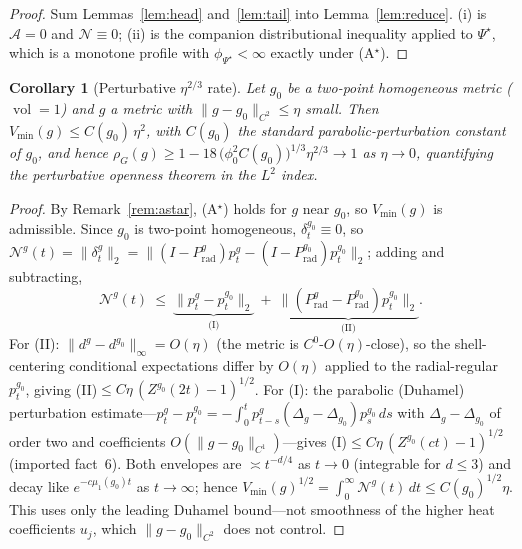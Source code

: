 \documentclass[11pt]{article}
\newtheorem{corollary}[theorem]{Corollary}
\theoremstyle{remark}
\newcommand{\vol}{\operatorname{vol}}
\newcommand{\rhoG}{\rho_G}
\begin{document}
\begin{proof}
Sum Lemmas~\ref{lem:head} and~\ref{lem:tail} into Lemma~\ref{lem:reduce}. (i) is
$\mathcal A=0$ and $\mathcal N\equiv0$; (ii) is the companion distributional inequality
applied to $\Psi^\star$, which is a monotone profile with $\phi_{\Psi^\star}<\infty$ exactly
under \textup{(A$^\star$)}.
\end{proof}

\begin{corollary}[Perturbative $\eta^{2/3}$ rate]\label{cor:pert}
Let $g_0$ be a two-point homogeneous metric ($\vol=1$) and $g$ a metric with
$\lVert g-g_0\rVert_{C^2}\le\eta$ small. Then $V_{\min}(g)\le C(g_0)\,\eta^2$, with $C(g_0)$
the standard parabolic-perturbation constant of $g_0$, and hence
$\rhoG(g)\ge1-18\,\bigl(\phi_0^2C(g_0)\bigr)^{1/3}\eta^{2/3}\to1$ as $\eta\to0$, quantifying
the perturbative openness theorem in the $L^2$ index.
\end{corollary}

\begin{proof}
By Remark~\ref{rem:astar}, (A$^\star$) holds for $g$ near $g_0$, so $V_{\min}(g)$ is
admissible. Since $g_0$ is two-point homogeneous, $\delta_t^{g_0}\equiv0$, so
$\mathcal N^g(t)=\lVert\delta_t^g\rVert_2=\lVert(I-P^g_{\mathrm{rad}})p_t^g
-(I-P^{g_0}_{\mathrm{rad}})p_t^{g_0}\rVert_2$; adding and subtracting,
\[
\mathcal N^g(t)\ \le\ \underbrace{\lVert p_t^g-p_t^{g_0}\rVert_2}_{\text{(I)}}
\ +\ \underbrace{\lVert(P^g_{\mathrm{rad}}-P^{g_0}_{\mathrm{rad}})p_t^{g_0}\rVert_2}_{\text{(II)}}.
\]
For (II): $\lVert d^g-d^{g_0}\rVert_\infty=O(\eta)$ (the metric is $C^0$-$O(\eta)$-close), so
the shell-centering conditional expectations differ by $O(\eta)$ applied to the radial-regular
$p_t^{g_0}$, giving (II)$\le C\eta\,(Z^{g_0}(2t)-1)^{1/2}$. For (I): the parabolic (Duhamel)
perturbation estimate---$p_t^g-p_t^{g_0}=-\int_0^t p^g_{t-s}(\Delta_g-\Delta_{g_0})p^{g_0}_s\,ds$
with $\Delta_g-\Delta_{g_0}$ of order two and coefficients $O(\lVert g-g_0\rVert_{C^1})$---gives
(I)$\le C\eta\,(Z^{g_0}(c t)-1)^{1/2}$ (imported fact~6). Both envelopes are $\asymp t^{-d/4}$
as $t\to0$ (integrable for $d\le3$) and decay like $e^{-c\mu_1(g_0)t}$ as $t\to\infty$; hence
$V_{\min}(g)^{1/2}=\int_0^\infty\mathcal N^g(t)\,dt\le C(g_0)^{1/2}\eta$. This uses only the
leading Duhamel bound---not smoothness of the higher heat coefficients $u_j$, which
$\lVert g-g_0\rVert_{C^2}$ does not control.
\end{proof}
\end{document}
